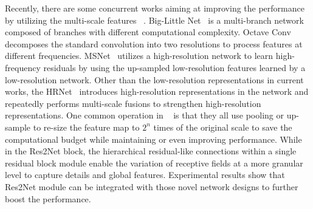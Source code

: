 \documentclass[10pt,journal,cspaper,compsoc]{IEEEtran}
\newcommand{\secref}[1]{Section 1}
\newcommand{\secref}[1]{Sec.~\ref{#1}}
\newcommand{\myPara}[1]{\subsubsection{#1}}
\newcommand{\ourM}{{Res2Net}}
\newcommand{\sArt}{{state-of-the-art~}}
\def\etal{{\em et al.}}
\def\etal{{\em et al.}}
\begin{document}
Recently, there are some concurrent works aiming at improving the performance
by utilizing the multi-scale features
~\cite{chen2019drop,chen2018biglittle,cheng2019high,SunZJCXLMWLW19}.
Big-Little Net~\cite{chen2018biglittle} is a multi-branch network 
composed of branches with different computational complexity.
Octave Conv~\cite{chen2019drop} decomposes the standard convolution into 
two resolutions to process features at different frequencies.
MSNet~\cite{cheng2019high} utilizes a high-resolution network to learn
high-frequency residuals by using the up-sampled low-resolution features 
learned by a low-resolution network.
Other than the low-resolution representations in current works, 
the HRNet~\cite{SunXLW19,SunZJCXLMWLW19} introduces high-resolution
representations in the network and repeatedly performs multi-scale 
fusions to strengthen high-resolution representations.
One common operation in
~\cite{chen2019drop,chen2018biglittle,cheng2019high,SunXLW19,SunZJCXLMWLW19} 
is that they all use pooling or up-sample
to re-size the feature map to $2^n$ times of the original scale 
to save the computational budget while maintaining or even improving performance.
While in the Res2Net block, the hierarchical
residual-like connections within a single residual
block module enable the variation of receptive fields 
at a more granular level to capture details and global features.
Experimental results show that Res2Net module can be integrated 
with those novel network designs to further boost the performance.




\end{document}
